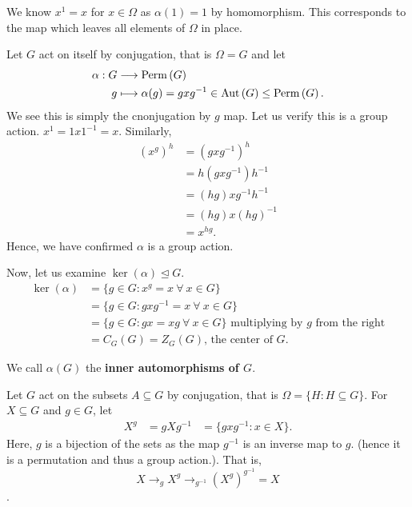 \begin{remark}
	We know \(x^{1}=x\) for \(x \in \Omega\) as \(\alpha\left( 1 \right) =1\) by homomorphism. This corresponds to the map which leaves all elements of \(\Omega\) in place.
\end{remark}
\begin{example}
Let \(G\) act on itself by conjugation, that is \(\Omega = G\) and let  \begin{align*}
	\alpha: G &\longrightarrow  \operatorname{Perm}\left( G \right) \\
	g	 &\longmapsto \alpha(g) = g x g^{-1} \in \operatorname{Aut}\left( G \right) \le \operatorname{Perm}\left( G \right)
.\end{align*}
We see this is simply the cnonjugation by \(g\) map. Let us verify this is a group action. \(x^{1}= 1x 1^{-1} = x\). Similarly,
\begin{align*}
	\left( x^{g} \right)^{h}&= \left( gxg^{-1} \right) ^{h}\\
				&= h\left( gxg^{-1} \right) h^{-1}\\
				&=\left( hg \right) xg^{-1}h^{-1}\\
				&= \left( hg \right) x \left( hg \right) ^{-1}\\
				&= x^{hg}
.\end{align*}
Hence, we have confirmed \(\alpha\) is a group action.
\end{example}
Now, let us examine \(\ker \left( \alpha \right) \trianglelefteq G\).\\
\begin{align*}
	\ker \left( \alpha \right)  &= \{g \in G : x^{g}= x \ \forall \ x \in G\} \\
		      &= \{g \in G: gxg^{-1} = x \ \forall \ x \in G\} \\
		&= \{g \in G : gx=xg \ \forall \ x \in G\} \text{ multiplying by \(g\) from the right}\\
		      &=C_{G}\left(  G \right) = Z_{G}\left( G \right) \text{, the center of \(G\)}
.\end{align*}
\begin{definition}
	We call \(\alpha \left( G \right) \) the \textbf{inner automorphisms of \(G\)}.
\end{definition}
\begin{example}
	Let \(G\) act on the subsets \(A \subseteq G\) by conjugation, that is \(\Omega = \{H : H \subseteq G\} \). For \(X \subseteq G\) and \(g \in G\),  let \begin{align*}
		X^{g}&= gXg^{-1}
		     &= \{gxg^{-1} : x \in X\}
	.\end{align*}
	Here, \(g\) is a bijection of the sets as the map \(g ^{-1}\) is an inverse map to \(g.\) (hence it is a permutation and thus a group action.). That is,  \[X \to_{g} X^{g}\to_{g^{-1}} \left( X^{g} \right)^{g^{-1}}= X \].
\end{example}
